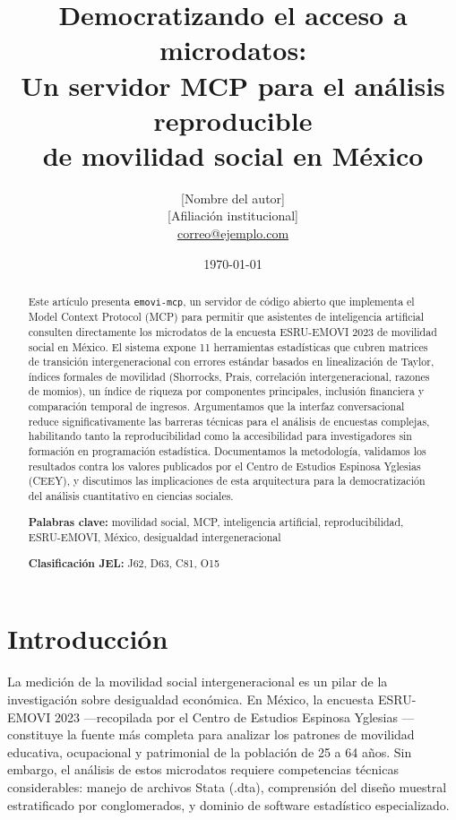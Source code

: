 \documentclass[12pt, a4paper]{article}
\title{%
  Democratizando el acceso a microdatos:\\
  Un servidor MCP para el análisis reproducible\\
  de movilidad social en México%
}
\author{%
  [Nombre del autor]\\
  \small [Afiliación institucional]\\
  \small \href{mailto:correo@ejemplo.com}{correo@ejemplo.com}
}
\date{\today}
\begin{document}
\maketitle

\begin{abstract}
Este artículo presenta \texttt{emovi-mcp}, un servidor de código abierto que implementa el Model Context Protocol (MCP) para permitir que asistentes de inteligencia artificial consulten directamente los microdatos de la encuesta ESRU-EMOVI 2023 de movilidad social en México. El sistema expone 11 herramientas estadísticas que cubren matrices de transición intergeneracional con errores estándar basados en linealización de Taylor, índices formales de movilidad (Shorrocks, Prais, correlación intergeneracional, razones de momios), un índice de riqueza por componentes principales, inclusión financiera y comparación temporal de ingresos. Argumentamos que la interfaz conversacional reduce significativamente las barreras técnicas para el análisis de encuestas complejas, habilitando tanto la reproducibilidad como la accesibilidad para investigadores sin formación en programación estadística. Documentamos la metodología, validamos los resultados contra los valores publicados por el Centro de Estudios Espinosa Yglesias (CEEY), y discutimos las implicaciones de esta arquitectura para la democratización del análisis cuantitativo en ciencias sociales.

\medskip
\noindent\textbf{Palabras clave:} movilidad social, MCP, inteligencia artificial, reproducibilidad, ESRU-EMOVI, México, desigualdad intergeneracional

\medskip
\noindent\textbf{Clasificación JEL:} J62, D63, C81, O15
\end{abstract}

\newpage
\tableofcontents
\newpage

\section{Introducción}
\label{sec:intro}

La medición de la movilidad social intergeneracional es un pilar de la investigación sobre desigualdad económica. En México, la encuesta ESRU-EMOVI 2023 ---recopilada por el Centro de Estudios Espinosa Yglesias \citep{ceey2025}--- constituye la fuente más completa para analizar los patrones de movilidad educativa, ocupacional y patrimonial de la población de 25 a 64 años. Sin embargo, el análisis de estos microdatos requiere competencias técnicas considerables: manejo de archivos Stata (.dta), comprensión del diseño muestral estratificado por conglomerados, y dominio de software estadístico especializado.
\end{document}

